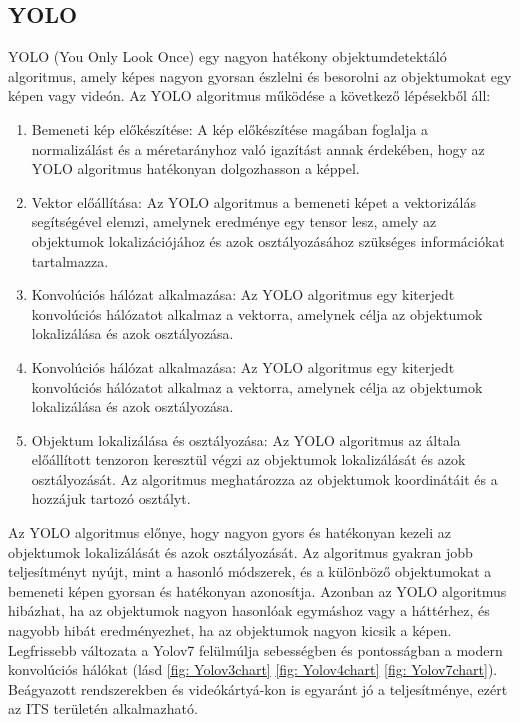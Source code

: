 \documentclass[acmtog, authorversion]{acmart}
\begin{document}
\subsection{YOLO}
YOLO (You Only Look Once) egy nagyon hatékony objektumdetektáló algoritmus, amely képes nagyon gyorsan észlelni és besorolni az objektumokat egy képen vagy videón.
Az YOLO algoritmus működése a következő lépésekből áll:
\begin{enumerate}
    \item Bemeneti kép előkészítése: A kép előkészítése magában foglalja a normalizálást és a méretarányhoz való igazítást annak érdekében, hogy az YOLO algoritmus hatékonyan dolgozhasson a képpel.
    \item Vektor előállítása: Az YOLO algoritmus a bemeneti képet a vektorizálás segítségével elemzi, amelynek eredménye egy tensor lesz, amely az objektumok lokalizációjához és azok osztályozásához szükséges információkat tartalmazza.
    \item Konvolúciós hálózat alkalmazása: Az YOLO algoritmus egy kiterjedt konvolúciós hálózatot alkalmaz a vektorra, amelynek célja az objektumok lokalizálása és azok osztályozása.
    \item Konvolúciós hálózat alkalmazása: Az YOLO algoritmus egy kiterjedt konvolúciós hálózatot alkalmaz a vektorra, amelynek célja az objektumok lokalizálása és azok osztályozása.
    \item Objektum lokalizálása és osztályozása: Az YOLO algoritmus az általa előállított tenzoron keresztül végzi az objektumok lokalizálását és azok osztályozását. Az algoritmus meghatározza az objektumok koordinátáit és a hozzájuk tartozó osztályt.
\end{enumerate}
Az YOLO algoritmus előnye, hogy nagyon gyors és hatékonyan kezeli az objektumok lokalizálását és azok osztályozását. Az algoritmus gyakran jobb teljesítményt nyújt, mint a hasonló módszerek, és a különböző objektumokat a bemeneti képen gyorsan és hatékonyan azonosítja. Azonban az YOLO algoritmus hibázhat, ha az objektumok nagyon hasonlóak egymáshoz vagy a háttérhez, és nagyobb hibát eredményezhet, ha az objektumok nagyon kicsik a képen.
Legfrissebb változata a Yolov7 felülmúlja sebességben és pontosságban a modern konvolúciós hálókat (lásd \ref{fig: Yolov3chart} \ref{fig: Yolov4chart} \ref{fig: Yolov7chart}). Beágyazott rendszerekben és videókártyá-kon is egyaránt jó a teljesítménye, ezért az ITS területén alkalmazható. 
\end{document}
